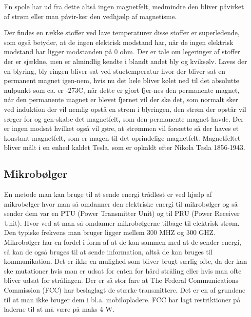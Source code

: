 En spole har ud fra dette altså ingen magnetfelt, medmindre den bliver påvirket af strøm eller man påvir-ker den vedhjælp af magnetisme. 

Der findes en række stoffer ved lave temperaturer disse stoffer er superledende, som også betyder, at de ingen elektrisk modstand har, når de ingen elektrisk modstand har ligger modstanden på 0 ohm. Der er tale om legeringer af stoffer der er sjældne, men er almindlig kendte i blandt andet bly og kviksølv. Laves der en blyring, bly ringen bliver sat ved stuetemperatur hvor der bliver sat en permanent magnet igen-nem, hvis nu det hele bliver kølet ned til det absolutte nulpunkt som ca. er -273C, når dette er gjort fjer-nes den permanente magnet, når den permanente magnet er blevet fjernet vil der ske det, som normalt sker ved induktion der vil nemlig opstå en strøm i blyringen, den strøm der opstår vil sørger for og gen-skabe det magnetfelt, som den permanente magnet havde. Der er ingen modsat hvilket også vil gøre, at strømmen vil forsætte så der haves et konstant magnetfelt, som er magen til det oprindelige magnetfelt. Magnetfeltet bliver målt i en enhed kaldet Tesla, som er opkaldt efter Nikola Tesla 1856-1943. 


\subsection{Mikrobølger}

En metode man kan bruge til at sende energi trådløst er ved hjælp af mikrobølger hvor man så omdanner den elektriske energi til mikrobølger og så sender dem var en PTU (Power Transmitter Unit) og til PRU (Power Receiver Unit). Hvor ved at man så omdanner mikrobølgerne tilbage til elektrisk strøm. Den typiske frekvens man bruger ligger mellem 300 MHZ og 300 GHZ. Mikrobølger har en fordel i form af at de kan sammen med at de sender energi, så kan de også bruges til at sende information, altså de kan bruges til kommunikation.  Det er ikke en mulighed som bliver brugt særlig ofte, da der kan ske mutationer hvis man er udsat for enten for hård stråling eller hvis man ofte bliver udsat for strålingen. Der er så stor fare at The Federal Communications Commission (FCC) har beslaglagt de stærke transmittere. Det er en af grundene til at man ikke bruger dem i bl.a. mobilopladere. FCC har lagt restriktioner på laderne til at må være på maks 4 W.

